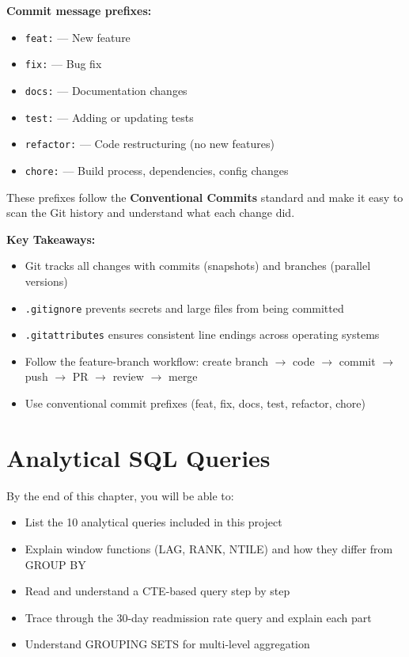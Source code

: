 \documentclass[12pt, a4paper, oneside]{report}
\begin{document}
\begin{notebox}
    \textbf{Commit message prefixes:}
    \begin{itemize}
        \item \texttt{feat:} --- New feature
        \item \texttt{fix:} --- Bug fix
        \item \texttt{docs:} --- Documentation changes
        \item \texttt{test:} --- Adding or updating tests
        \item \texttt{refactor:} --- Code restructuring (no new features)
        \item \texttt{chore:} --- Build process, dependencies, config changes
    \end{itemize}
    These prefixes follow the \textbf{Conventional Commits} standard and make it easy to scan the Git history and understand what each change did.
\end{notebox}

\begin{summarybox}
\textbf{Key Takeaways:}
\begin{itemize}
    \item Git tracks all changes with commits (snapshots) and branches (parallel versions)
    \item \texttt{.gitignore} prevents secrets and large files from being committed
    \item \texttt{.gitattributes} ensures consistent line endings across operating systems
    \item Follow the feature-branch workflow: create branch $\rightarrow$ code $\rightarrow$ commit $\rightarrow$ push $\rightarrow$ PR $\rightarrow$ review $\rightarrow$ merge
    \item Use conventional commit prefixes (feat, fix, docs, test, refactor, chore)
\end{itemize}
\end{summarybox}


\chapter{Analytical SQL Queries}
\label{ch:queries}

\begin{objectivebox}
By the end of this chapter, you will be able to:
\begin{itemize}
    \item List the 10 analytical queries included in this project
    \item Explain window functions (LAG, RANK, NTILE) and how they differ from GROUP BY
    \item Read and understand a CTE-based query step by step
    \item Trace through the 30-day readmission rate query and explain each part
    \item Understand GROUPING SETS for multi-level aggregation
\end{itemize}
\end{objectivebox}
\end{document}
